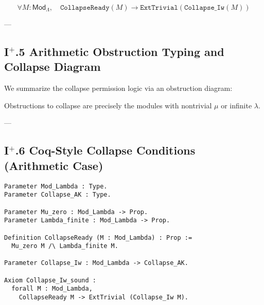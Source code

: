 \documentclass[11pt]{article}
\begin{document}
\[
\forall M : \mathsf{Mod}_\Lambda, \quad \texttt{CollapseReady}(M) \to \texttt{ExtTrivial}(\texttt{Collapse\_Iw}(M))
\]

---

\subsection*{I$^{+}$.5 Arithmetic Obstruction Typing and Collapse Diagram}

We summarize the collapse permission logic via an obstruction diagram:

\begin{center}
\end{center}

Obstructions to collapse are precisely the modules with nontrivial $\mu$ or infinite $\lambda$.

---

\subsection*{I$^{+}$.6 Coq-Style Collapse Conditions (Arithmetic Case)}

\begin{lstlisting}[language=Coq]
Parameter Mod_Lambda : Type.
Parameter Collapse_AK : Type.

Parameter Mu_zero : Mod_Lambda -> Prop.
Parameter Lambda_finite : Mod_Lambda -> Prop.

Definition CollapseReady (M : Mod_Lambda) : Prop :=
  Mu_zero M /\ Lambda_finite M.

Parameter Collapse_Iw : Mod_Lambda -> Collapse_AK.

Axiom Collapse_Iw_sound :
  forall M : Mod_Lambda,
    CollapseReady M -> ExtTrivial (Collapse_Iw M).
\end{lstlisting}
\end{document}
